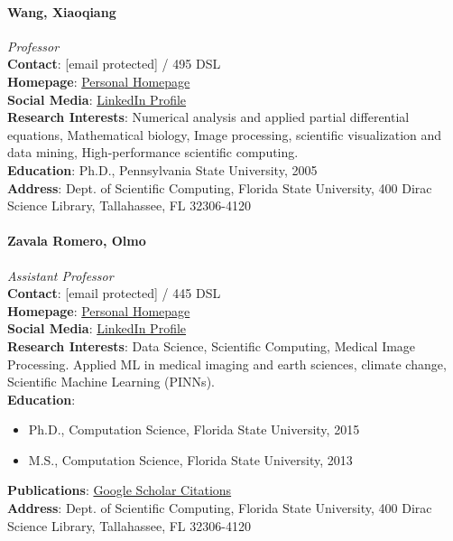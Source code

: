 \documentclass[12pt,a4paper]{article}
\begin{document}
\paragraph{Wang, Xiaoqiang}
\textit{Professor}\\
\textbf{Contact}: [email protected] / 495 DSL\\
\textbf{Homepage}: \href{http://people.sc.fsu.edu/~wwang3/}{Personal Homepage}\\
\textbf{Social Media}: \href{https://www.linkedin.com/in/xiaoqiang-wang-34078512/}{LinkedIn Profile}\\
\textbf{Research Interests}: Numerical analysis and applied partial differential equations, Mathematical biology, Image processing, scientific visualization and data mining, High-performance scientific computing.\\
\textbf{Education}: Ph.D., Pennsylvania State University, 2005\\
\textbf{Address}: Dept. of Scientific Computing, Florida State University, 400 Dirac Science Library, Tallahassee, FL 32306-4120

\paragraph{Zavala Romero, Olmo}
\textit{Assistant Professor}\\
\textbf{Contact}: [email protected] / 445 DSL\\
\textbf{Homepage}: \href{http://people.sc.fsu.edu/~osz09/}{Personal Homepage}\\
\textbf{Social Media}: \href{https://www.linkedin.com/in/olmozavala/}{LinkedIn Profile}\\
\textbf{Research Interests}: Data Science, Scientific Computing, Medical Image Processing. Applied ML in medical imaging and earth sciences, climate change, Scientific Machine Learning (PINNs).\\
\textbf{Education}:
\begin{itemize}
    \item Ph.D., Computation Science, Florida State University, 2015
    \item M.S., Computation Science, Florida State University, 2013
\end{itemize}
\textbf{Publications}: \href{https://scholar.google.com/citations?user=m2A2s9wAAAAJ}{Google Scholar Citations}\\
\textbf{Address}: Dept. of Scientific Computing, Florida State University, 400 Dirac Science Library, Tallahassee, FL 32306-4120
\end{document}
